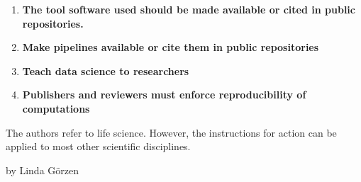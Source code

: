 \documentclass{article}
\begin{document}
\begin{enumerate}
\item \textbf{The tool software used should be made available or cited in public repositories.}


\item \textbf{Make pipelines available or cite them in public repositories}


\item \textbf{Teach data science to researchers}


\item \textbf{Publishers and reviewers must enforce reproducibility of computations}


\end{enumerate}

The authors refer to life science. However, the instructions for action can be applied to most other scientific disciplines.





by Linda Görzen





\printbibliography[title={Bibliography}]
\end{document}
